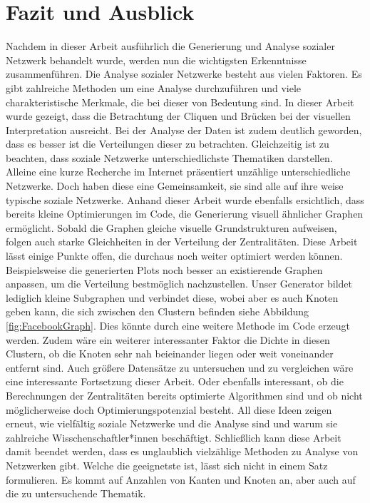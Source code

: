 \chapter{Fazit und Ausblick}\label{ch:fazit}

Nachdem in dieser Arbeit ausführlich die Generierung und Analyse sozialer Netzwerk behandelt wurde, werden nun die wichtigsten Erkenntnisse zusammenführen. Die Analyse sozialer Netzwerke besteht aus vielen Faktoren. Es gibt zahlreiche Methoden um eine Analyse durchzuführen und viele charakteristische Merkmale, die bei dieser von Bedeutung sind. In dieser Arbeit wurde gezeigt, dass die Betrachtung der Cliquen und Brücken bei der visuellen Interpretation ausreicht. Bei der Analyse der Daten ist zudem deutlich geworden, dass es besser ist die Verteilungen dieser zu betrachten. Gleichzeitig ist zu beachten, dass soziale Netzwerke unterschiedlichste Thematiken darstellen. Alleine eine kurze Recherche im Internet präsentiert unzählige unterschiedliche Netzwerke. Doch haben diese eine Gemeinsamkeit, sie sind alle auf ihre weise typische soziale Netzwerke. Anhand dieser Arbeit wurde ebenfalls ersichtlich, dass bereits kleine Optimierungen im Code, die Generierung visuell ähnlicher Graphen ermöglicht. Sobald die Graphen gleiche visuelle Grundstrukturen aufweisen, folgen auch starke Gleichheiten in der Verteilung der Zentralitäten. Diese Arbeit lässt einige Punkte offen, die durchaus noch weiter optimiert werden können. Beispielsweise die generierten Plots noch besser an existierende Graphen anpassen, um die Verteilung bestmöglich nachzustellen. 
Unser Generator bildet lediglich kleine Subgraphen und verbindet diese, wobei aber es auch Knoten geben kann, die sich zwischen den Clustern befinden siehe Abbildung \ref{fig:FacebookGraph}. Dies könnte durch eine weitere Methode im Code erzeugt werden. Zudem wäre ein weiterer interessanter Faktor die Dichte in diesen Clustern, ob die Knoten sehr nah beieinander liegen oder weit voneinander entfernt sind.
Auch größere Datensätze zu untersuchen und zu vergleichen wäre eine interessante Fortsetzung dieser Arbeit. Oder ebenfalls interessant, ob die Berechnungen der Zentralitäten bereits optimierte Algorithmen sind und ob nicht möglicherweise doch Optimierungspotenzial besteht.  
All diese Ideen zeigen erneut, wie vielfältig soziale Netzwerke und die Analyse sind und warum sie zahlreiche Wisschenschaftler*innen beschäftigt. Schließlich kann diese Arbeit damit beendet werden, dass es unglaublich vielzählige Methoden zu Analyse von Netzwerken gibt. Welche die geeignetste ist, lässt sich nicht in einem Satz formulieren. Es kommt auf Anzahlen von Kanten und Knoten an, aber auch auf die zu untersuchende Thematik.
